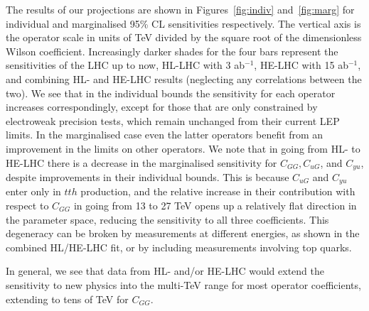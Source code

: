 \documentclass[../report.tex]{subfiles}
\providecommand{\main}{..}
\begin{document}
The results of our projections are shown in Figures~\ref{fig:indiv} and~\ref{fig:marg} for individual and marginalised 95\% CL sensitivities respectively. The vertical axis is the operator scale in units of TeV divided by the square root of the dimensionless Wilson coefficient. Increasingly darker shades for the four bars represent the sensitivities of the LHC up to now, HL-LHC with 3 ab$^{-1}$, HE-LHC with 15 ab$^{-1}$, and combining HL- and HE-LHC results (neglecting any correlations between the two). We see that in the individual bounds the sensitivity for each operator increases correspondingly, except for those that are only constrained by electroweak precision tests, which remain unchanged from their current LEP limits. In the marginalised case even the latter operators benefit from an improvement in the limits on other operators. We note that in going from HL- to HE-LHC there is a decrease in the marginalised sensitivity for $C_{GG}, C_{uG}$, and $C_{yu}$, despite improvements in their individual bounds. This is because $C_{uG}$ and $C_{yu}$ enter only in $tth$ production, and the relative increase in their contribution with respect to $C_{GG}$ in going from 13 to 27 TeV opens up a relatively flat direction in the parameter space, reducing the sensitivity to all three coefficients. This degeneracy can be broken by measurements at different energies, as shown in the combined HL/HE-LHC fit, or by including measurements involving top quarks.

In general, we see that data from HL- and/or HE-LHC would extend the sensitivity to new physics into the multi-TeV range
for most operator coefficients, extending to tens of TeV for $C_{GG}$.













\FloatBarrier

\end{document}
